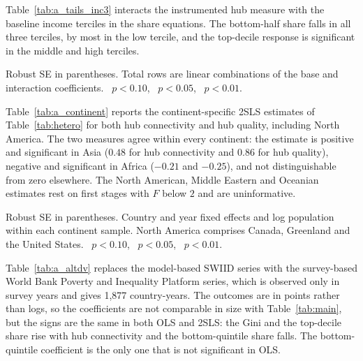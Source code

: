 Table~\ref{tab:a_tails_inc3} interacts the instrumented hub measure with the baseline income terciles in the share equations. The bottom-half share falls in all three terciles, by most in the low tercile, and the top-decile response is significant in the middle and high terciles.

\begin{table}[H]\centering\caption{Distributional location by baseline income tercile (interaction 2SLS, Feyrer instrument).}\label{tab:a_tails_inc3}
\begin{threeparttable}\small
\begin{tablenotes}\footnotesize\item Robust SE in parentheses. Total rows are linear combinations of the base and interaction coefficients. \sym{*}~$p<0.10$, \sym{**}~$p<0.05$, \sym{***}~$p<0.01$.\end{tablenotes}\end{threeparttable}\end{table}

Table~\ref{tab:a_continent} reports the continent-specific 2SLS estimates of Table~\ref{tab:hetero} for both hub connectivity and hub quality, including North America. The two measures agree within every continent: the estimate is positive and significant in Asia ($0.48$ for hub connectivity and $0.86$ for hub quality), negative and significant in Africa ($-0.21$ and $-0.25$), and not distinguishable from zero elsewhere. The North American, Middle Eastern and Oceanian estimates rest on first stages with $F$ below $2$ and are uninformative.

\begin{table}[H]\centering\caption{Continent-specific 2SLS, both connectivity measures (Feyrer instrument).}\label{tab:a_continent}
\begin{threeparttable}\small
\begin{tablenotes}\footnotesize\item Robust SE in parentheses. Country and year fixed effects and log population within each continent sample. North America comprises Canada, Greenland and the United States. \sym{*}~$p<0.10$, \sym{**}~$p<0.05$, \sym{***}~$p<0.01$.\end{tablenotes}\end{threeparttable}\end{table}

Table~\ref{tab:a_altdv} replaces the model-based SWIID series with the survey-based World Bank Poverty and Inequality Platform series, which is observed only in survey years and gives 1,877 country-years. The outcomes are in points rather than logs, so the coefficients are not comparable in size with Table~\ref{tab:main}, but the signs are the same in both OLS and 2SLS: the Gini and the top-decile share rise with hub connectivity and the bottom-quintile share falls. The bottom-quintile coefficient is the only one that is not significant in OLS.

